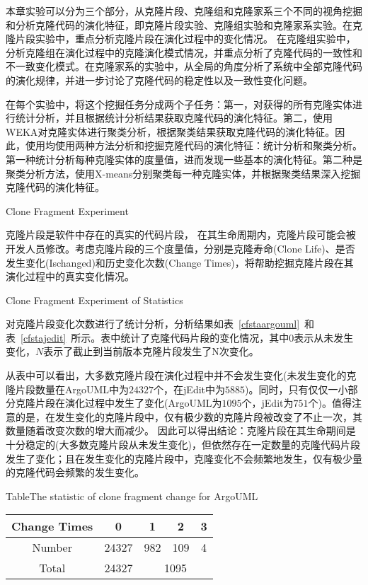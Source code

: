 本章实验可以分为三个部分，从克隆片段、克隆组和克隆家系三个不同的视角挖掘和分析克隆代码的演化特征，即克隆片段实验、克隆组实验和克隆家系实验。在克隆片段实验中，重点分析克隆片段在演化过程中的变化情况。 在克隆组实验中，分析克隆组在演化过程中的克隆演化模式情况，并重点分析了克隆代码的一致性和不一致变化模式。在克隆家系的实验中，从全局的角度分析了系统中全部克隆代码的演化规律，并进一步讨论了克隆代码的稳定性以及一致性变化问题。

在每个实验中，将这个挖掘任务分成两个子任务：第一，对获得的所有克隆实体进行统计分析，并且根据统计分析结果获取克隆代码的演化特征。第二，使用WEKA对克隆实体进行聚类分析，根据聚类结果获取克隆代码的演化特征。因此，使用均使用两种方法分析和挖掘克隆代码的演化特征：统计分析和聚类分析。第一种统计分析每种克隆实体的度量值，进而发现一些基本的演化特征。第二种是聚类分析方法，使用{X-means}分别聚类每一种克隆实体，并根据聚类结果深入挖掘克隆代码的演化特征。

{Clone Fragment Experiment}

克隆片段是软件中存在的真实的代码片段， 在其生命周期内，克隆片段可能会被开发人员修改。考虑克隆片段的三个度量值，分别是克隆寿命(Clone Life)、是否发生变化(Ischanged)和历史变化次数(Change Times)，将帮助挖掘克隆片段在其演化过程中的真实变化情况。

{Clone Fragment Experiment of Statistics}

对克隆片段变化次数进行了统计分析，分析结果如表~\ref{cfstaargouml}~和表~\ref{cfstajedit}~所示。表中统计了克隆代码片段的变化情况，其中$0$表示从未发生变化，$N$表示了截止到当前版本克隆片段发生了N次变化。

从表中可以看出，大多数克隆片段在演化过程中并不会发生变化(未发生变化的克隆片段数量在ArgoUML中为$24327$个，在jEdit中为$5885$)。同时，只有仅仅一小部分克隆片段在演化过程中发生了变化(ArgoUML为$1095$个，jEdit为$751$个)。值得注意的是，在发生变化的克隆片段中，仅有极少数的克隆片段被改变了不止一次，其数量随着改变次数的增大而减少。 因此可以得出结论：克隆片段在其生命期间是十分稳定的(大多数克隆片段从未发生变化)，但依然存在一定数量的克隆代码片段发生了变化；且在发生变化的克隆片段中，克隆变化不会频繁地发生，仅有极少量的克隆代码会频繁的发生变化。

\begin{table}[htbp]
{Table$\!$}{The statistic of clone fragment change for ArgoUML}
\vspace{0.5em}
\centering
\wuhao
\begin{tabular}{ccccc}
\toprule[1.5pt]
Change Times&0&1&2&3\\ 
\midrule[1pt]
Number&24327&982&109&4\\ 
\cline{3-5}
Total&24327&\multicolumn{3}{c}{1095} \\
\bottomrule[1.5pt]
\end{tabular}
\end{table}

